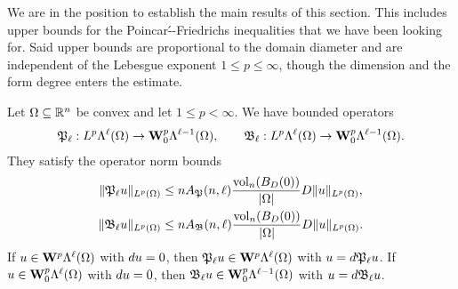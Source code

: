 \documentclass[12pt,a4paper]{article}
\begin{document}
We are in the position to establish the main results of this section.
This includes upper bounds for the Poincar\'--Friedrichs inequalities that we have been looking for. 
Said upper bounds are proportional to the domain diameter and are independent of the Lebesgue exponent $1 \leq p \leq \infty$,
though the dimension and the form degree enters the estimate. 

\begin{theorem}
    Let $\Omega \subseteq {\mathbb R}^{n}$ be convex and let $1 \leq p < \infty$. 
    We have bounded operators 
    \begin{align*}
        {\mathfrak P}_{\ell} : L^{p}\Lambda^{\ell}(\Omega) \rightarrow {\mathbf W}^{p}_{0}\Lambda^{\ell-1}(\Omega)
        ,
        \qquad 
        {\mathfrak B}_{\ell} : L^{p}\Lambda^{\ell}(\Omega) \rightarrow {\mathbf W}^{p}_{0}\Lambda^{\ell-1}(\Omega)
        .
    \end{align*}
    They satisfy the operator norm bounds 
    \begin{align*}
        \| {\mathfrak P}_{\ell} u \|_{L^{p}(\Omega)}
        &\leq 
        n A_{{\mathfrak P}}(n,\ell) \frac{ \operatorname{vol}_{n}(B_D(0)) }{|\Omega|} 
        D
        \| u \|_{L^{p}(\Omega)}
        ,
        \\
        \| {\mathfrak B}_{\ell} u \|_{L^{p}(\Omega)}
        &\leq 
        n A_{{\mathfrak B}}(n,\ell) \frac{ \operatorname{vol}_{n}(B_D(0)) }{|\Omega|} 
        D
        \| u \|_{L^{p}(\Omega)}
        .
    \end{align*}
    If $u \in {\mathbf W}^{p}    \Lambda^{\ell}(\Omega)$ with $d u = 0$, then ${\mathfrak P}_{\ell} u \in {\mathbf W}^{p}    \Lambda^{\ell  }(\Omega)$ with $u = d {\mathfrak P}_{\ell} u$.
    If $u \in {\mathbf W}^{p}_{0}\Lambda^{\ell}(\Omega)$ with $d u = 0$, then ${\mathfrak B}_{\ell} u \in {\mathbf W}^{p}_{0}\Lambda^{\ell-1}(\Omega)$ with $u = d {\mathfrak B}_{\ell} u$.
\end{theorem}
\end{document}

